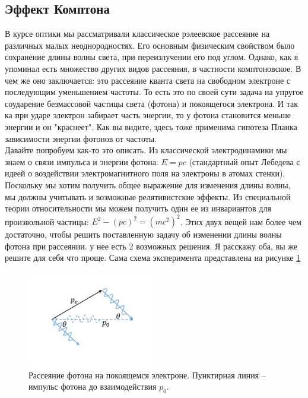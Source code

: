 \documentclass[12pt]{article}
\begin{document}
\subsection{Эффект Комптона}
В курсе оптики мы рассматривали классическое рэлеевское рассеяние на различных малых неоднородностях. Его основным физическим свойством было сохранение длины волны света, при переизлучении его под углом. Однако, как я упоминал есть множество других видов рассеяния, в частности комптоновское. В чем же оно заключается: это рассеяние кванта света на свободном электроне с последующим уменьшением частоты. То есть это по своей сути задача на упругое соударение безмассовой частицы света (фотона) и покоящегося электрона. И так ка при ударе электрон забирает часть энергии, то у фотона становится меньше энергии и он "краснеет". Как вы видите, здесь тоже применима гипотеза Планка зависимости энергии фотонов от частоты.
\\
Давайте попробуем как-то это описать. Из классической электродинамики мы знаем о связи импульса и энергии фотона: $E = pc$ (стандартный опыт Лебедева с идеей о воздействии электромагнитного поля на электроны в атомах стенки). Поскольку мы хотим получить общее выражение для изменения длины волны, мы должны учитывать и возможные релятивистские эффекты. Из специальной теории относительности мы можем получить  один ее из инвариантов для произвольной частицы: $E^2 -(pc)^2 = (mc^2)^2$. Этих двух вещей нам более чем достаточно, чтобы решить поставленную задачу об изменении длины волны фотона при рассеянии. у нее есть 2 возможных решения. Я расскажу оба, вы же решите для себя что проще. Сама схема эксперимента представлена на рисунке \ref{fig:sem_02_kompton}
\begin{figure}[h]
    \centering
    \includegraphics[width=0.5\textwidth,keepaspectratio]{Seminar_02/pics/pic_03.pdf}
    \caption{Рассеяние фотона на покоящемся электроне. Пунктирная линия -- импульс фотона до взаимодействия $p_0$.}
    \label{fig:sem_02_kompton}
\end{figure}
\end{document}
